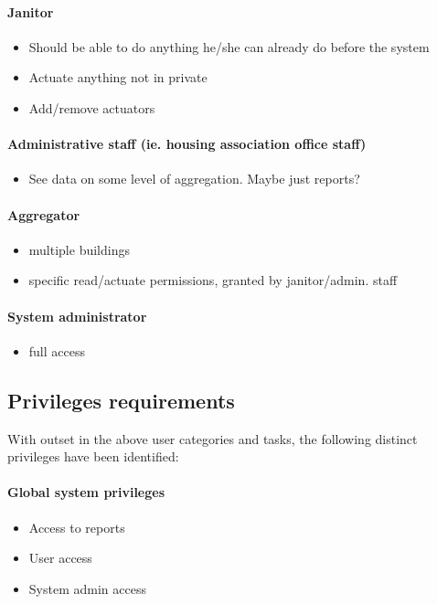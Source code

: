 \documentclass{report}
\begin{document}
\paragraph{Janitor}
\begin{itemize}
    \item{Should be able to do anything he/she can already do before the system}
    \item{Actuate anything not in private}
    \item{Add/remove actuators}
\end{itemize}

\paragraph{Administrative staff (ie. housing association office staff)}
\begin{itemize}
    \item{See data on some level of aggregation. Maybe just reports?}
\end{itemize}

\paragraph{Aggregator}
\begin{itemize}
    \item{multiple buildings}
    \item{specific read/actuate permissions, granted by janitor/admin. staff}
\end{itemize}

\paragraph{System administrator}
\begin{itemize}
    \item{full access}
\end{itemize}

\subsection{Privileges requirements} \label{subsection:PrivilegesRequirements}
With outset in the above user categories and tasks, the following distinct privileges have been identified:

\paragraph{Global system privileges}
\begin{itemize}
    \item{Access to reports}
    \item{User access}
    \item{System admin access}
\end{itemize}
\end{document}
